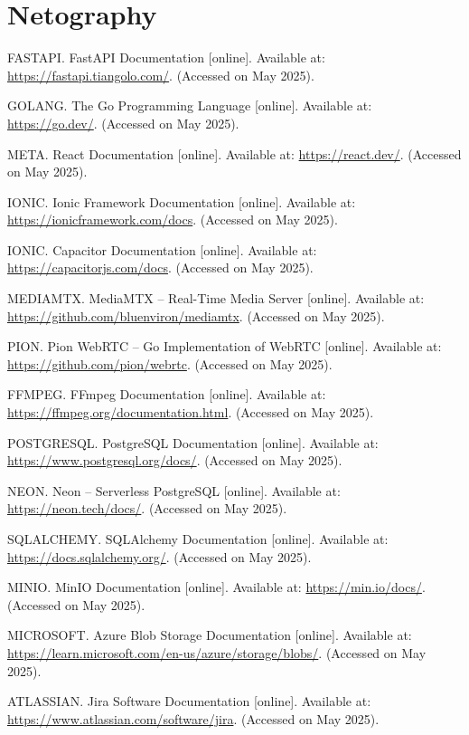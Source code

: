 \documentclass[12pt,a4paper,oneside]{report}
\begin{document}
\section*{Netography}
\begin{enumerate}[label={[\arabic*]}, start=6]
\item FASTAPI. FastAPI Documentation [online]. Available at: \url{https://fastapi.tiangolo.com/}. (Accessed on May 2025).
\item GOLANG. The Go Programming Language [online]. Available at: \url{https://go.dev/}. (Accessed on May 2025).
\item META. React Documentation [online]. Available at: \url{https://react.dev/}. (Accessed on May 2025).
\item IONIC. Ionic Framework Documentation [online]. Available at: \url{https://ionicframework.com/docs}. (Accessed on May 2025).
\item IONIC. Capacitor Documentation [online]. Available at: \url{https://capacitorjs.com/docs}. (Accessed on May 2025).
\item MEDIAMTX. MediaMTX -- Real-Time Media Server [online]. Available at: \url{https://github.com/bluenviron/mediamtx}. (Accessed on May 2025).
\item PION. Pion WebRTC -- Go Implementation of WebRTC [online]. Available at: \url{https://github.com/pion/webrtc}. (Accessed on May 2025).
\item FFMPEG. FFmpeg Documentation [online]. Available at: \url{https://ffmpeg.org/documentation.html}. (Accessed on May 2025).
\item POSTGRESQL. PostgreSQL Documentation [online]. Available at: \url{https://www.postgresql.org/docs/}. (Accessed on May 2025).
\item NEON. Neon -- Serverless PostgreSQL [online]. Available at: \url{https://neon.tech/docs/}. (Accessed on May 2025).
\item SQLALCHEMY. SQLAlchemy Documentation [online]. Available at: \url{https://docs.sqlalchemy.org/}. (Accessed on May 2025).
\item MINIO. MinIO Documentation [online]. Available at: \url{https://min.io/docs/}. (Accessed on May 2025).
\item MICROSOFT. Azure Blob Storage Documentation [online]. Available at: \url{https://learn.microsoft.com/en-us/azure/storage/blobs/}. (Accessed on May 2025).
\item ATLASSIAN. Jira Software Documentation [online]. Available at: \url{https://www.atlassian.com/software/jira}. (Accessed on May 2025).

\end{enumerate}
\end{document}
